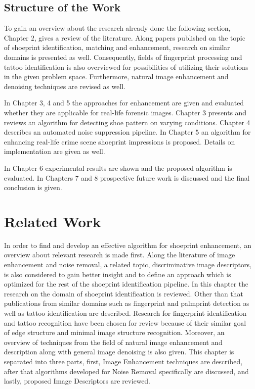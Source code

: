 \documentclass[draft,final]{vutinfth} %
\begin{document}
\section{Structure of the Work}
\par
To gain an overview about the research already done the following section, Chapter 2, gives a review of the literature. 
Along papers published on the topic of shoeprint identification, matching and enhancement, research on similar domains is presented as well.
Consequently, fields of fingerprint processing and tattoo identification is also overviewed for possibilities of utilizing their solutions in the given problem space.
Furthermore, natural image enhancement and denoising techniques are revised as well.
\par
In Chapter 3, 4 and 5 the approaches for enhancement are given and evaluated whether they are applicable for real-life forensic images.
Chapter 3 presents and reviews an algorithm for detecting shoe pattern on varying conditions.
Chapter 4 describes an automated noise suppression pipeline.
In Chapter 5 an algorithm for enhancing real-life crime scene shoeprint impressions is proposed.
Details on implementation are given as well.
\par
In Chapter 6 experimental results are shown and the proposed algorithm is evaluated.
In Chapters 7 and 8 prospective future work is discussed and the final conclusion is given. 

\chapter{Related Work}
\par
In order to find and develop an effective algorithm for shoeprint enhancement, an overview about relevant research is made first.
Along the literature of image enhancement and noise removal, a related topic, discriminative image descriptors, is also considered to gain better insight and to define an approach which is optimized for the rest of the shoeprint identification pipeline.
In this chapter the research on the domain of shoeprint identification is reviewed.
Other than that publications from similar domains such as fingerprint and palmprint detection as well as tattoo identification are described.
Research for fingerprint identification and tattoo recognition have been chosen for review because of their similar goal of edge structure and minimal image structure recognition.
Moreover, an overview of techniques from the field of natural image enhancement and description along with general image denoising is also given.
This chapter is separated into three parts, first, Image Enhancement techniques are described, after that algorithms developed for Noise Removal specifically are discussed, and lastly, proposed Image Descriptors are reviewed.
\end{document}
